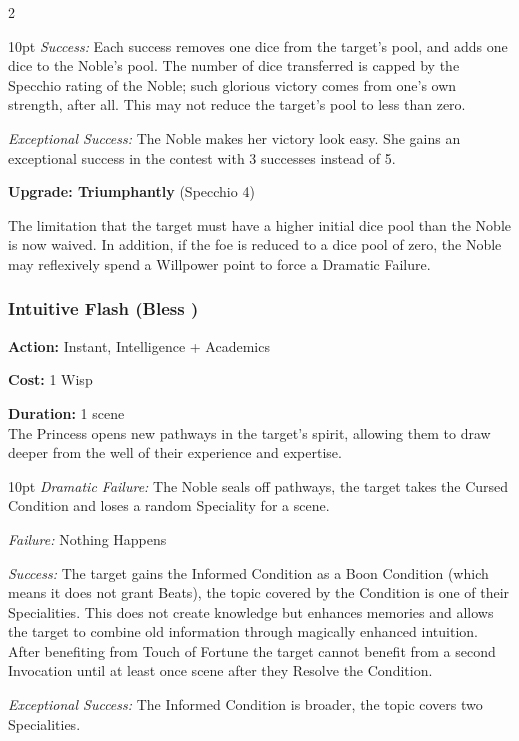 \begin{multicols}{2}
\begin{myindentpar}{10pt}
\emph{Success:}  Each success removes one dice from the target’s pool, and adds one dice to the Noble’s pool. The number of dice transferred is capped by the Specchio rating of the Noble; such glorious victory comes from one’s own strength, after all. This may not reduce the target’s pool to less than zero.

\emph{Exceptional Success:}  The Noble makes her victory look easy. She gains an exceptional success in the contest with 3 successes instead of 5.

\textbf{Upgrade: Triumphantly} (Specchio 4)

The limitation that the target must have a higher initial dice pool than the Noble is now waived. In addition, if the foe is reduced to a dice pool of zero, the Noble may reflexively spend a Willpower point to force a Dramatic Failure.\end{myindentpar}

\subsubsection*{Intuitive Flash (Bless \textbullet\textbullet)}

\noindent \textbf{Action:} Instant, Intelligence + Academics

\noindent \textbf{Cost:} 1 Wisp

\noindent \textbf{Duration:} 1 scene \\

\noindent The Princess opens new pathways in the target's spirit, allowing them to draw deeper from the well of their experience and expertise. 

\begin{myindentpar}{10pt} \emph{Dramatic Failure:} The Noble seals off pathways, the target takes the Cursed Condition and loses a random Speciality for a scene.

\emph{Failure:} Nothing Happens 

\emph{Success:} The target gains the Informed Condition as a Boon Condition (which means it does not grant Beats), the topic covered by the Condition is one of their Specialities. This does not create knowledge but enhances memories and allows the target to combine old information through magically enhanced intuition. After benefiting from Touch of Fortune the target cannot benefit from a second Invocation until at least once scene after they Resolve the Condition. 

\emph{Exceptional Success:} The Informed Condition is broader, the topic covers two Specialities.\end{myindentpar}


\end{multicols}
